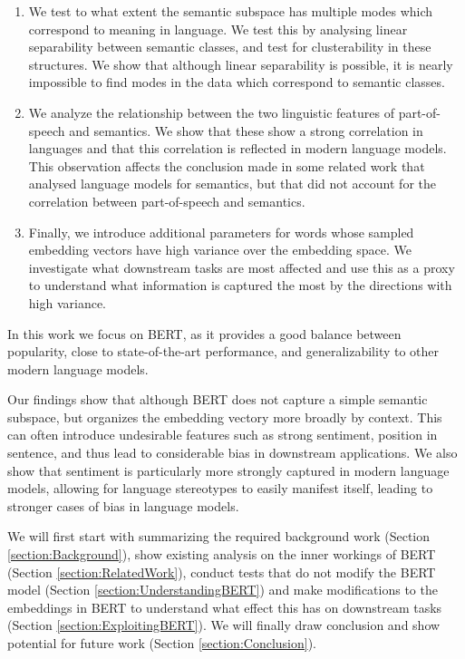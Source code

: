 \documentclass[a4paper,12pt,oneside,openright]{report}
\begin{document}
\begin{enumerate}
\item We test to what extent the semantic subspace has multiple modes which correspond to meaning in language.
We test this by analysing linear separability between semantic classes, and test for clusterability in these structures.
We show that although linear separability is possible, it is nearly impossible to find modes in the data which correspond to semantic classes.
\item We analyze the relationship between the two linguistic features of part-of-speech and semantics. 
We show that these show a strong correlation in languages and that this correlation is reflected in modern language models.
This observation affects the conclusion made in some related work that analysed language models for semantics, but that did not account for the correlation between part-of-speech and semantics.
\item Finally, we introduce additional parameters for words whose sampled embedding vectors have high variance over the embedding space.
We investigate what downstream tasks are most affected  and use this as a proxy to understand what information is captured the most by the directions with high variance.
\end{enumerate} 

In this work we focus on BERT, as it provides a good balance between popularity, close to state-of-the-art performance, and generalizability to other modern language models.

Our findings show that although BERT does not capture a simple semantic subspace, but organizes the embedding vectory more broadly by context.
This can often introduce undesirable features such as strong sentiment, position in sentence, and thus lead to considerable bias in downstream applications.
We also show that sentiment is particularly more strongly captured in modern language models, allowing for language stereotypes to easily manifest itself, leading to stronger cases of bias in language models.

We will first start with summarizing the required background work (Section \ref{section:Background}), show existing analysis on the inner workings of BERT (Section \ref{section:RelatedWork}), conduct tests that do not modify the BERT model (Section \ref{section:UnderstandingBERT}) and make modifications to the embeddings in BERT to understand what effect this has on downstream tasks (Section \ref{section:ExploitingBERT}).
We will finally draw conclusion and show potential for future work (Section \ref{section:Conclusion}).
\end{document}
